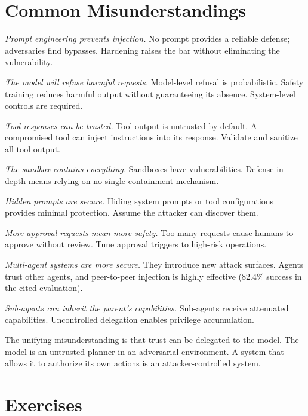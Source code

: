 \documentclass[11pt]{book}
\begin{document}
\section{Common Misunderstandings}

\textit{Prompt engineering prevents injection.} No prompt provides a reliable defense; adversaries find bypasses. Hardening raises the bar without eliminating the vulnerability.

\textit{The model will refuse harmful requests.} Model-level refusal is probabilistic. Safety training reduces harmful output without guaranteeing its absence. System-level controls are required.

\textit{Tool responses can be trusted.} Tool output is untrusted by default. A compromised tool can inject instructions into its response. Validate and sanitize all tool output.

\textit{The sandbox contains everything.} Sandboxes have vulnerabilities. Defense in depth means relying on no single containment mechanism.

\textit{Hidden prompts are secure.} Hiding system prompts or tool configurations provides minimal protection. Assume the attacker can discover them.

\textit{More approval requests mean more safety.} Too many requests cause humans to approve without review. Tune approval triggers to high-risk operations.

\textit{Multi-agent systems are more secure.} They introduce new attack surfaces. Agents trust other agents, and peer-to-peer injection is highly effective (82.4\% success in the cited evaluation).

\textit{Sub-agents can inherit the parent's capabilities.} Sub-agents receive attenuated capabilities. Uncontrolled delegation enables privilege accumulation.

The unifying misunderstanding is that trust can be delegated to the model. The model is an untrusted planner in an adversarial environment. A system that allows it to authorize its own actions is an attacker-controlled system.

\section*{Exercises}
\end{document}
